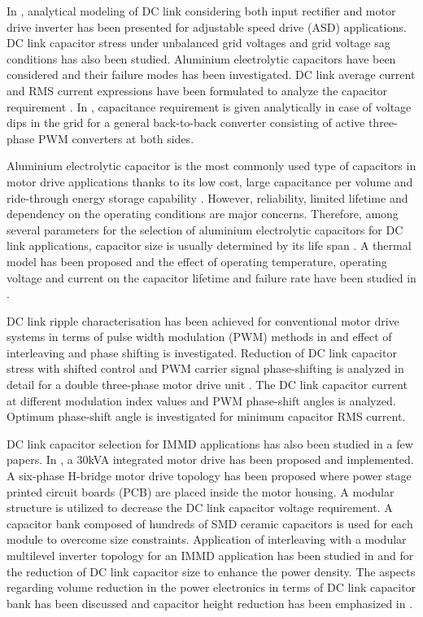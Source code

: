 \documentclass[conference,a4paper,twocolumn]{IEEEtran}
\begin{document}
In \cite{Lee2007}, analytical modeling of DC link considering both input rectifier and motor drive inverter has been presented for adjustable speed drive (ASD) applications. DC link capacitor stress under unbalanced grid voltages and grid voltage sag conditions has also been studied. Aluminium electrolytic capacitors have been considered and their failure modes has been investigated. DC link average current and RMS current expressions have been formulated to analyze the capacitor requirement \cite{Bianchi2003,Gohil2014,Rixin2007}. In \cite{Rixin2007}, capacitance requirement is given analytically in case of voltage dips in the grid for a general back-to-back converter consisting of active three-phase PWM converters at both sides.

Aluminium electrolytic capacitor is the most commonly used type of capacitors in motor drive applications thanks to its low cost, large capacitance per volume and ride-through energy storage capability \cite{Lee2007}. However, reliability, limited lifetime and dependency on the operating conditions are major concerns. Therefore, among several parameters for the selection of aluminium electrolytic capacitors for DC link applications, capacitor size is usually determined by its life span \cite{Lee2007}. A thermal model has been proposed and the effect of operating temperature, operating voltage and current on the capacitor lifetime and failure rate have been studied in \cite{Bianchi2003,Gohil2014}.

DC link ripple characterisation has been achieved for conventional motor drive systems in terms of pulse width modulation (PWM) methods in \cite{Gohil2014} and effect of interleaving and phase shifting is investigated. Reduction of DC link capacitor stress with shifted control and PWM carrier signal phase-shifting is analyzed in detail for a double three-phase motor drive unit \cite{Basler2015}. The DC link capacitor current at different modulation index values and PWM phase-shift angles is analyzed. Optimum phase-shift angle is investigated for minimum capacitor RMS current.

DC link capacitor selection for IMMD applications has also been studied in a few papers. In \cite{Engelmann2015}, a 30kVA integrated motor drive has been proposed and implemented. A six-phase H-bridge motor drive topology has been proposed where power stage printed circuit boards (PCB) are placed inside the motor housing. A modular structure is utilized to decrease the DC link capacitor voltage requirement. A capacitor bank composed of hundreds of SMD ceramic capacitors is used for each module to overcome size constraints. Application of interleaving with a modular multilevel inverter topology for an IMMD application has been studied in \cite{Wang2013} and \cite{Wang2014} for the reduction of DC link capacitor size to enhance the power density. The aspects regarding volume reduction in the power electronics in terms of DC link capacitor bank has been discussed and capacitor height reduction has been emphasized in \cite{Wang2013}.
\end{document}
